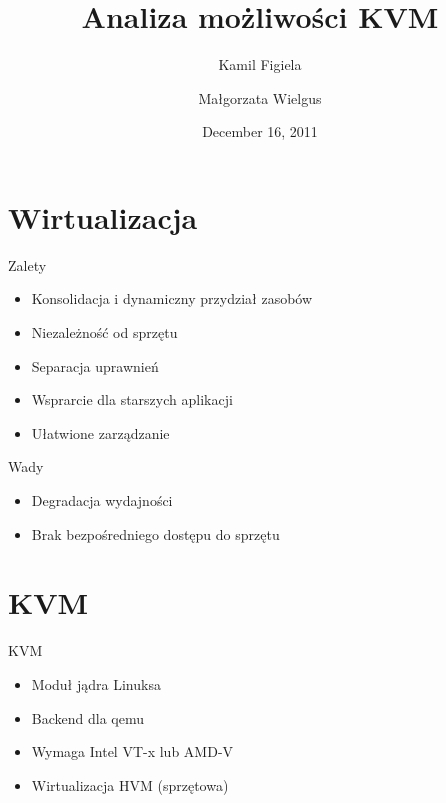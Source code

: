 \documentclass{beamer}
\title[\insertframenumber/\inserttotalframenumber]{Analiza możliwości KVM}
\institute[AGH]{AGH University of Science and Technology, Kraków}
\author[K. Figiela, M. Wielgus]{Kamil Figiela \and Małgorzata Wielgus}
\date{December 16, 2011}
\begin{document}
\begin{frame}[plain]
  \titlepage
\end{frame}

\section{Wirtualizacja}

\begin{frame}{Zalety}
  \begin{itemize}
    \item Konsolidacja i dynamiczny przydział zasobów
    \item Niezależność od sprzętu
    \item Separacja uprawnień
    \item Wsprarcie dla starszych aplikacji
    \item Ułatwione zarządzanie
  \end{itemize}
\end{frame}
  
\begin{frame}{Wady}
  \begin{itemize}
    \item Degradacja wydajności
    \item Brak bezpośredniego dostępu do sprzętu
  \end{itemize}
\end{frame}

\section{KVM}
\begin{frame}{KVM}
  \begin{itemize}
    \item Moduł jądra Linuksa
    \item Backend dla qemu
    \item Wymaga Intel VT-x lub AMD-V
    \item Wirtualizacja HVM (sprzętowa)    
  \end{itemize}
\end{frame}
\end{document}
